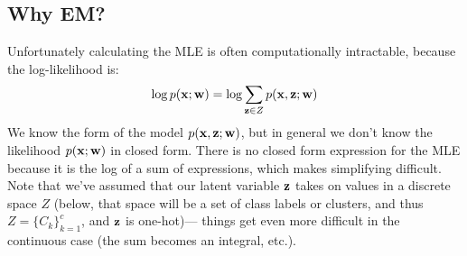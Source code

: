 \documentclass[12pt,letterpaper]{article}
\begin{document}
\subsection{Why EM?}
Unfortunately calculating the MLE is often computationally intractable, because the log-likelihood is:
\begin{align}
    \log p(\mathbf{x}; \mathbf{w}) = \log \sum_{\mathbf{z} \in Z} p(\mathbf{x}, \mathbf{z}; \mathbf{w})
\end{align}
We know the form of the model $p(\mathbf{x}, \mathbf{z}; \mathbf{w})$, but in general we don't know the likelihood $p(\mathbf{x}; \mathbf{w})$ in closed form. There is no closed form expression for the MLE because it is the log of a sum of expressions, which makes simplifying difficult. Note that we've assumed that our latent variable $\mathbf{z}$ takes on values in a discrete space $Z$ (below, that space will be a set of class labels or clusters, and thus $Z = \{C_k\}_{k=1}^c$, and $\mathbf{z}$ is one-hot)--- things get even more difficult in the continuous case (the sum becomes an integral, etc.).
\end{document}
